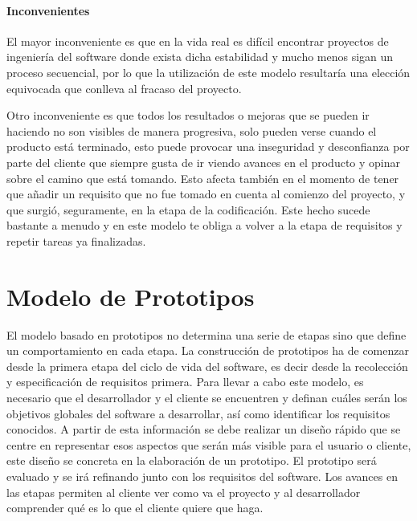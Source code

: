 \paragraph{Inconvenientes}

El mayor inconveniente es que en la vida real es difícil encontrar
proyectos de ingeniería del software donde exista dicha estabilidad y
mucho menos sigan un proceso secuencial, por lo que la utilización de
este modelo resultaría una elección equivocada que conlleva al fracaso
del proyecto.
 
Otro inconveniente es que todos los resultados o mejoras que se pueden
ir haciendo no son visibles de manera progresiva, solo pueden verse
cuando el producto está terminado, esto puede provocar una inseguridad
y desconfianza por parte del cliente que siempre gusta de ir viendo
avances en el producto y opinar sobre el camino que está tomando. Esto
afecta también en el momento de tener que añadir un requisito que no
fue tomado en cuenta al comienzo del proyecto, y que surgió,
seguramente, en la etapa de la codificación. Este hecho sucede
bastante a menudo y en este modelo te obliga a volver a la etapa de
requisitos y repetir tareas ya finalizadas.

\section{Modelo de Prototipos}
\label{sec:prototipos}
El modelo basado en prototipos no determina una serie de etapas sino
que define un comportamiento en cada etapa. La construcción de
prototipos ha de comenzar desde la primera etapa del ciclo de vida del
software, es decir desde la recolección y especificación de requisitos
primera. Para llevar a cabo este modelo, es necesario que el
desarrollador y el cliente se encuentren y definan cuáles serán los
objetivos globales del software a desarrollar, así como identificar
los requisitos conocidos. A partir de esta información se debe
realizar un diseño rápido que se centre en representar esos aspectos
que serán más visible para el usuario o cliente, este diseño se
concreta en la elaboración de un prototipo. El prototipo será evaluado
y se irá refinando junto con los requisitos del software. Los avances
en las etapas permiten al cliente ver como va el proyecto y al
desarrollador comprender qué es lo que el cliente quiere que haga.

